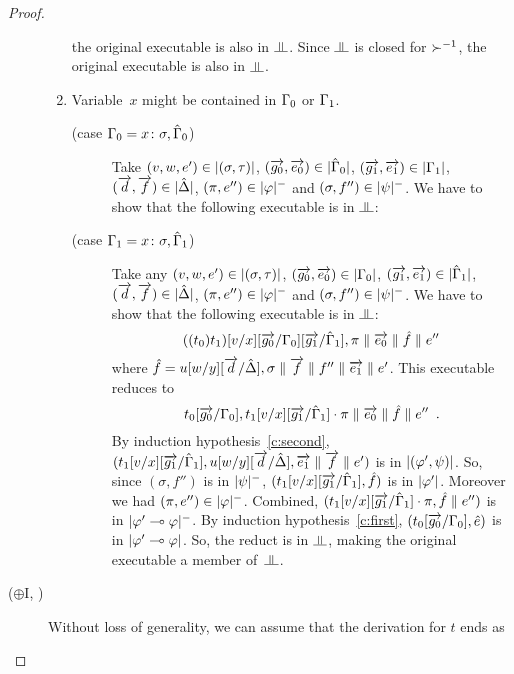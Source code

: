 \begin{proof}
\begin{description}
\begin{enumerate}[label=\textit{(\arabic{*})}]
	       the original executable is also in $\bbot$.
	       Since $\bbot$ is closed for $\succ^{-1}$, the original
	       executable is also in $\bbot$.
	 \item Variable~$x$ might be contained in $\Gamma_0$ or $\Gamma_1$.
	       \begin{description}
		\item[(case $\Gamma_0 = {x} \colon{\sigma},\hat{\Gamma}_0$)]
		     Take
		     $(v,w,e')\in|{(\sigma,\tau)}|$,
		     $(\overrightarrow{g_0},\overrightarrow{e_0})\in|{\hat{\Gamma}_0}|$,
		     $(\overrightarrow{g_1},\overrightarrow{e_1})\in|{\Gamma_1}|$,
		     $(\overrightarrow{d},\overrightarrow{f})\in|{\hat{\Delta}}|$,
		     $(\pi,e'')\in|{\varphi}|^-$ and
		     $(\sigma,f'')\in|{\psi}|^-$.
		     We have to show that the following executable is in $\bbot$:
		\item[(case $\Gamma_1 = {x} \colon{\sigma},\hat{\Gamma}_1$)]
	      Take any
	      $(v,w,e')\in|{(\sigma,\tau)}|$,
	      $(\overrightarrow{g_0},\overrightarrow{e_0})\in|{\Gamma_0}|$,
	      $(\overrightarrow{g_1},\overrightarrow{e_1})\in|{\hat{\Gamma}_1}|$,
	      $(\overrightarrow{d},\overrightarrow{f})\in|{\hat{\Delta}}|$,
	      $(\pi,e'')\in|{\varphi}|^-$ and
	      $(\sigma,f'')\in|{\psi}|^-$.
	      We have to show that the following executable is in $\bbot$:
	      \[
	       ((t_0)t_1)[v/x][\overrightarrow{g_0}/\Gamma_0][\overrightarrow{g_1}/\hat{\Gamma}_1],\pi\parallel
	      \overrightarrow{e_0}
	      \parallel\hat{f}\parallel
	      e''
	      \]
	      where
	      $\hat f = u[w/y][\overrightarrow{d}/\hat{\Delta}],\sigma\parallel
	      \overrightarrow{f}\parallel f''\parallel \overrightarrow{e_1}\parallel e'$.  This executable reduces
	      to
	      \[
	       t_0[\overrightarrow{g_0}/\Gamma_0],t_1[v/x][\overrightarrow{g_1}/\hat{\Gamma}_1]\cdot \pi\parallel
	      \overrightarrow{e_0}
	      \parallel\hat{f}\parallel
	      e''\enspace.
	      \]
	      By induction hypothesis~\ref{c:second},
		     $(t_1[v/x][\overrightarrow{g_1}/\hat{\Gamma}_1],
		     u[w/y][\overrightarrow{d}/\hat{\Delta}], \overrightarrow{e_1}\parallel \overrightarrow{f}\parallel
		     e')$ is in $|{(\varphi',\psi)}|$.
		     So, since $(\sigma,f'')$ is in $|{\psi}|^-$,
	      $(t_1[v/x][\overrightarrow{g_1}/\hat{\Gamma}_1],\hat f)$ is in
	      $|{\varphi'}|$.
	      Moreover we had $(\pi,e'')\in|{\varphi}|^-$.
	      Combined,
	      $(t_1[v/x][\overrightarrow{g_1}/\hat{\Gamma}_1]\cdot\pi,\hat f\parallel e'')$
	      is in $|{\varphi'\multimap\varphi}|^-$\kern -1pt.
	      By induction hypothesis~\ref{c:first},
	      $(t_0[\overrightarrow{g_0}/\Gamma_0],\hat e)$ is in
	      $|{\varphi'\multimap\varphi}|$.
	      So, the reduct is in $\bbot$, making the original
	      executable a member of~$\bbot$.
	       \end{description}
	\end{enumerate}
   \item[($\oplus$I, \textminus)]
	Without loss of generality, we can assume that the
	derivation for $t$ ends as

\end{description}
\end{proof}
